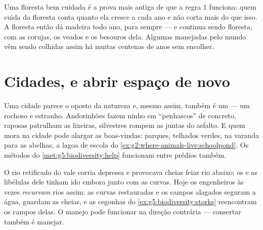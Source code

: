 \begin{example}\label{ex:g5:people-and-nature:forester}
Uma floresta bem cuidada é a prova mais antiga de que a regra 1
funciona: quem cuida da floresta conta quanto ela cresce a cada ano e
não corta mais do que isso. A floresta então dá madeira todo ano,
para sempre --- e continua sendo floresta, com as corujas, os veados
e os besouros dela. Algumas  manejadas pelo mundo vêm sendo
colhidas assim há muitas centenas de anos sem encolher.
\end{example}

\section{Cidades, e abrir espaço de novo}

\begin{example}\label{ex:g5:people-and-nature:city}
Uma cidade parece o oposto da natureza e, mesmo assim, também é um
 --- um  rochoso e estranho. Andorinhões fazem ninho em
``penhascos'' de concreto, raposas patrulham as lixeiras, 
silvestres rompem as juntas do asfalto. E quem mora na cidade pode
alargar as boas-vindas: parques, telhados verdes,  na varanda
para as abelhas, a lagoa de escola do
\cref{ex:g2:where-animals-live:schoolpond}. Os métodos do
\cref{met:g5:biodiversity:help} funcionam entre prédios também.
\end{example}

\begin{example}\label{ex:g5:people-and-nature:river}
O rio retificado do vale corria depressa e provocava cheias feias rio
abaixo; os  e as libélulas dele tinham ido embora junto com as
curvas. Hoje os engenheiros às vezes \emph{recurvam} rios assim: as
curvas restauradas e os campos alagados seguram a água, guardam as
cheias, e as cegonhas do \cref{ex:g5:biodiversity:storks} reencontram
os campos delas. O manejo pode funcionar na direção contrária ---
consertar também é manejar.
\end{example}

